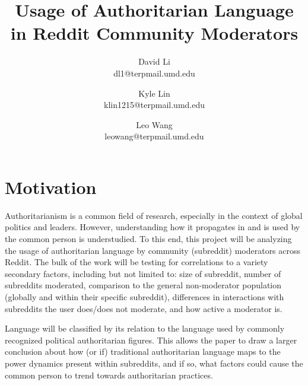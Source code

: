 \documentclass[letterpaper,twocolumn,10pt]{article}
\begin{document}

\date{}

\title{\Large \bf Usage of Authoritarian Language in Reddit Community Moderators}

\author{ %
{\rm David Li}\\
dl1@terpmail.umd.edu
\and
{\rm Kyle Lin}\\
klin1215@terpmail.umd.edu
\and
{\rm Leo Wang}\\
leowang@terpmail.umd.edu
}

\maketitle

\section{Motivation}


Authoritarianism is a common field of research, especially in the context of global politics and leaders. However, understanding how it propagates in and is used by the common person is understudied. To this end, this project will be analyzing the usage of authoritarian language by community (subreddit) moderators across Reddit. The bulk of the work will be testing for correlations to a variety secondary factors, including but not limited to: size of subreddit, number of subreddits moderated, comparison to the general non-moderator population (globally and within their specific subreddit), differences in interactions with subreddits the user does/does not moderate, and how active a moderator is.

Language will be classified by its relation to the language used by commonly recognized political authoritarian figures. This allows the paper to draw a larger conclusion about how (or if) traditional authoritarian language maps to the power dynamics present within subreddits, and if so, what factors could cause the common person to trend towards authoritarian practices.
\end{document}
